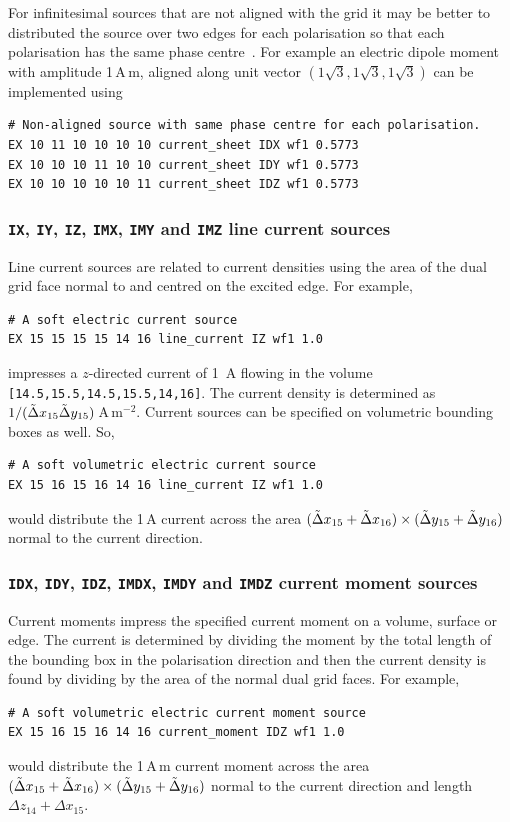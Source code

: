 \documentclass[onecolumn,a4paper]{article}
\numberwithin{equation}{section}
\begin{document}
For infinitesimal sources that are not aligned with the grid it may be better to distributed the source over two edges
for each polarisation so that each polarisation has the same phase centre~\cite{Noetscher2012}. For example an electric
dipole moment with amplitude 1\,A\,m, aligned along unit vector $(1\sqrt{3},1\sqrt{3},1\sqrt{3})$ can be implemented using
\begin{verbatim}
# Non-aligned source with same phase centre for each polarisation.
EX 10 11 10 10 10 10 current_sheet IDX wf1 0.5773
EX 10 10 10 11 10 10 current_sheet IDY wf1 0.5773
EX 10 10 10 10 10 11 current_sheet IDZ wf1 0.5773
\end{verbatim}

\subsubsection{\texttt{IX}, \texttt{IY}, \texttt{IZ}, \texttt{IMX}, \texttt{IMY} and \texttt{IMZ} line current sources}

Line current sources are related to current densities using the area of the dual grid face normal to and centred on the 
excited edge. For example, 
\begin{verbatim}
# A soft electric current source
EX 15 15 15 15 14 16 line_current IZ wf1 1.0
\end{verbatim}
impresses a $z$-directed current of 1\, A flowing in the volume 
\texttt{[14.5,15.5,14.5,15.5,14,16]}. The current density is determined as
$1/(\tilde{\Delta} x_{15} \tilde{\Delta} y_{15})$\,A\,m$^{-2}$. Current sources can be specified
on volumetric bounding boxes as well. So,
\begin{verbatim}
# A soft volumetric electric current source
EX 15 16 15 16 14 16 line_current IZ wf1 1.0
\end{verbatim}
would distribute the 1\,A current across the area $(\tilde{\Delta} x_{15} + \tilde{\Delta} x_{16})\times (\tilde{\Delta} y_{15} + \tilde{\Delta} y_{16}) $ 
normal to the current direction.

\subsubsection{\texttt{IDX}, \texttt{IDY}, \texttt{IDZ}, \texttt{IMDX}, \texttt{IMDY} and \texttt{IMDZ} current moment sources}

Current moments impress the specified current moment on a volume, surface or edge. The current
is determined by dividing the moment by the total length of the bounding box in the polarisation
direction and then the current density is found by dividing by the area of the normal dual grid
faces. For example,
\begin{verbatim}
# A soft volumetric electric current moment source
EX 15 16 15 16 14 16 current_moment IDZ wf1 1.0
\end{verbatim}
would distribute the 1\,A\,m current moment across the area $(\tilde{\Delta} x_{15} + \tilde{\Delta} x_{16})\times (\tilde{\Delta} y_{15} + \tilde{\Delta} y_{16}) $ 
normal to the current direction and length $\Delta z_{14}+\Delta x_{15}$.
\end{document}
